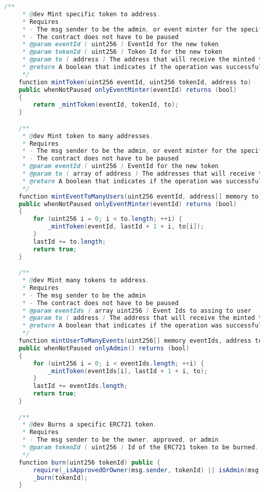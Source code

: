 \documentclass[MSE,Master,english]{twbook}%
\begin{document}
\begin{lstlisting}[language=Java, name={POAP Smart Contract}, label={sc:poapContract}]
    /**
     * @dev Mint specific token to address.
     * Requires 
     * - The msg sender to be the admin, or event minter for the specific event Id
     * - The contract does not have to be paused
     * @param eventId ( uint256 ) EventId for the new token
     * @param tokenId ( uint256 ) Token Id for the new token
     * @param to ( address ) The address that will receive the minted tokens.
     * @return A boolean that indicates if the operation was successful.
     */
    function mintToken(uint256 eventId, uint256 tokenId, address to)
    public whenNotPaused onlyEventMinter(eventId) returns (bool)
    {
        return _mintToken(eventId, tokenId, to);
    }

    /**
     * @dev Mint token to many addresses.
     * Requires 
     * - The msg sender to be the admin, or event minter for the specific event Id
     * - The contract does not have to be paused
     * @param eventId ( uint256 ) EventId for the new token
     * @param to ( array of address ) The addresses that will receive the minted tokens.
     * @return A boolean that indicates if the operation was successful.
     */
    function mintEventToManyUsers(uint256 eventId, address[] memory to)
    public whenNotPaused onlyEventMinter(eventId) returns (bool)
    {
        for (uint256 i = 0; i < to.length; ++i) {
            _mintToken(eventId, lastId + 1 + i, to[i]);
        }
        lastId += to.length;
        return true;
    }

    /**
     * @dev Mint many tokens to address.
     * Requires 
     * - The msg sender to be the admin
     * - The contract does not have to be paused
     * @param eventIds ( array uint256 ) Event Ids to assing to user
     * @param to ( address ) The address that will receive the minted tokens.
     * @return A boolean that indicates if the operation was successful.
     */
    function mintUserToManyEvents(uint256[] memory eventIds, address to)
    public whenNotPaused onlyAdmin() returns (bool)
    {
        for (uint256 i = 0; i < eventIds.length; ++i) {
            _mintToken(eventIds[i], lastId + 1 + i, to);
        }
        lastId += eventIds.length;
        return true;
    }

    /**
     * @dev Burns a specific ERC721 token.
     * Requires 
     * - The msg sender to be the owner, approved, or admin
     * @param tokenId ( uint256 ) Id of the ERC721 token to be burned.
     */
    function burn(uint256 tokenId) public {
        require(_isApprovedOrOwner(msg.sender, tokenId) || isAdmin(msg.sender), "Sender doesn't have permission");
        _burn(tokenId);
    }


\end{lstlisting}
\end{document}
